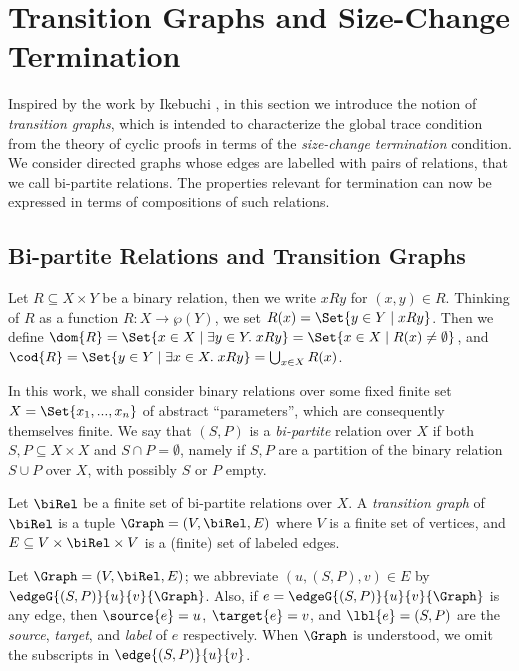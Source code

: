 \section{Transition Graphs and Size-Change Termination}
\label{sec:size-change}


Inspired by the work by Ikebuchi \cite{Mirai}, in this section we introduce the notion of {\em transition graphs}, which is intended to characterize the global trace condition from the theory of cyclic proofs in terms of the {\em size-change termination} condition. We consider directed graphs whose edges are labelled with pairs of relations, that we call bi-partite relations. The properties relevant for termination can now be expressed in terms of compositions of such relations.
 
 \subsection{Bi-partite Relations and Transition Graphs}
 
Let $R \subseteq X \times Y$ be a binary relation, then we write $x R y$ for $(x,y) \in R$. 
Thinking of $R$ as a function $R: X \to \wp(Y)$, we set $R(x) = \Set{y \in Y \mid x R y}$. 
Then we define $\dom{R} = \Set{x \in X \mid \exists y \in Y.\; xRy} 
= \Set{x \in X \mid R(x) \neq \emptyset}$, and
$\cod{R} = \Set{y \in Y \mid \exists x \in X.\; xRy} = \bigcup_{x \in X} R(x)$. 

In this work, we shall consider binary relations over some fixed finite set 
$X = \Set{x_1, ..., x_n}$ of abstract ``parameters'', which are consequently themselves finite. We say that $(S,P)$ is a {\em bi-partite} relation over $X$ if both $S, P \subseteq X \times X$ and $S \cap P = \emptyset$, namely if $S, P$ are a partition of the binary relation $S \cup P$ over $X$, with possibly $S$ or $P$ empty.

\begin{definition}\label{def:transitionGraph}
Let $\biRel$ be a finite set of bi-partite relations over $X$.
A {\em transition graph} of $\biRel$ is a tuple $\Graph = (V, \biRel, E)$ where $V$ is a finite set of vertices, and $E \subseteq V \times \biRel\times V$ is a (finite) set of labeled edges.
\end{definition}

Let $\Graph = (V, \biRel, E)$; we abbreviate $(u, (S,P), v) \in E$ by $\edgeG{(S,P)}{u}{v}{\Graph}$.
Also, if $e = \edgeG{(S,P)}{u}{v}{\Graph}$ is any edge, 
then $\source{e} = u$, $\target{e} = v$, and $\lbl{e} = (S,P)$ are the {\em source}, {\em target}, and {\em label}
of $e$ respectively. When $\Graph$ is understood, we omit the subscripts in $\edge{(S,P)}{u}{v}$. 

